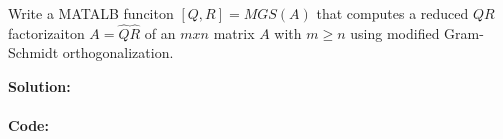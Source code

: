 \documentclass[12pt]{article}
\makeatletter
\theoremstyle{homework}
\newenvironment{exercise}[1]
{\def\@currentlabel{#1}\exercisecore}
{\endexercisecore}
\newcommand{\localhead}[1]{\par\smallskip\noindent\textbf{#1}\nobreak\\}%
\newcommand\solution{\localhead{Solution:}}
\makeatother
\begin{document}
  \begin{exercise}{8.2} Write a MATALB funciton $[Q, R] = MGS(A)$ that computes a reduced $QR$ factorizaiton $A = \hat{Q}\hat{R}$ of an $mxn$ matrix $A$
    with $m\geq n$ using modified Gram-Schmidt orthogonalization.\\
    \solution \\
    \textbf{Code:}
    \begin{center}
      
      \end{center}
  \end{exercise}
\end{document}
